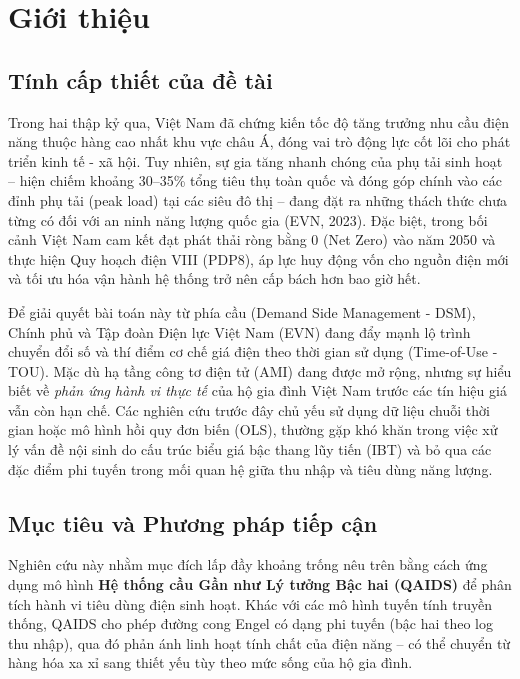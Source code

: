 \documentclass[12pt,a4paper,oneside]{article}
\begin{document}
	\section{Giới thiệu}
	\label{sec:intro}
	
	\subsection{Tính cấp thiết của đề tài}
	
	Trong hai thập kỷ qua, Việt Nam đã chứng kiến tốc độ tăng trưởng nhu cầu điện năng thuộc hàng cao nhất khu vực châu Á, đóng vai trò động lực cốt lõi cho phát triển kinh tế - xã hội. Tuy nhiên, sự gia tăng nhanh chóng của phụ tải sinh hoạt – hiện chiếm khoảng 30--35\% tổng tiêu thụ toàn quốc và đóng góp chính vào các đỉnh phụ tải (peak load) tại các siêu đô thị – đang đặt ra những thách thức chưa từng có đối với an ninh năng lượng quốc gia (EVN, 2023). Đặc biệt, trong bối cảnh Việt Nam cam kết đạt phát thải ròng bằng 0 (Net Zero) vào năm 2050 và thực hiện Quy hoạch điện VIII (PDP8), áp lực huy động vốn cho nguồn điện mới và tối ưu hóa vận hành hệ thống trở nên cấp bách hơn bao giờ hết.
	
	Để giải quyết bài toán này từ phía cầu (Demand Side Management - DSM), Chính phủ và Tập đoàn Điện lực Việt Nam (EVN) đang đẩy mạnh lộ trình chuyển đổi số và thí điểm cơ chế giá điện theo thời gian sử dụng (Time-of-Use - TOU). Mặc dù hạ tầng công tơ điện tử (AMI) đang được mở rộng, nhưng sự hiểu biết về \textit{phản ứng hành vi thực tế} của hộ gia đình Việt Nam trước các tín hiệu giá vẫn còn hạn chế. Các nghiên cứu trước đây chủ yếu sử dụng dữ liệu chuỗi thời gian hoặc mô hình hồi quy đơn biến (OLS), thường gặp khó khăn trong việc xử lý vấn đề nội sinh do cấu trúc biểu giá bậc thang lũy tiến (IBT) và bỏ qua các đặc điểm phi tuyến trong mối quan hệ giữa thu nhập và tiêu dùng năng lượng.
	
	\subsection{Mục tiêu và Phương pháp tiếp cận}
	
	Nghiên cứu này nhằm mục đích lấp đầy khoảng trống nêu trên bằng cách ứng dụng mô hình \textbf{Hệ thống cầu Gần như Lý tưởng Bậc hai (QAIDS)} để phân tích hành vi tiêu dùng điện sinh hoạt. Khác với các mô hình tuyến tính truyền thống, QAIDS cho phép đường cong Engel có dạng phi tuyến (bậc hai theo log thu nhập), qua đó phản ánh linh hoạt tính chất của điện năng – có thể chuyển từ hàng hóa xa xỉ sang thiết yếu tùy theo mức sống của hộ gia đình.
	
\end{document}
